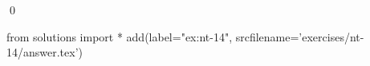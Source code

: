 
\begin{ex} 
  \label{ex:nt-14}
  
  \qed
\end{ex} 
\begin{python0}
from solutions import *
add(label="ex:nt-14",
    srcfilename='exercises/nt-14/answer.tex') 
\end{python0}
